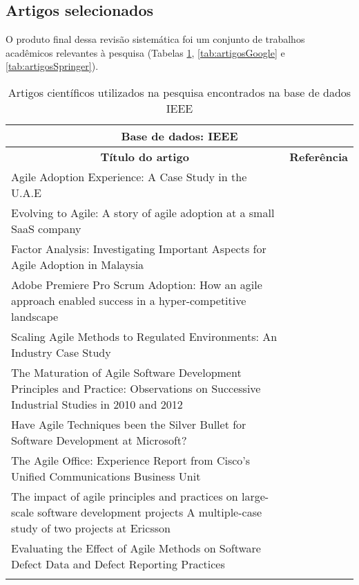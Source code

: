 \subsection{Artigos selecionados}

O produto final dessa revisão sistemática foi um conjunto de trabalhos acadêmicos relevantes à pesquisa (Tabelas \ref{tab:artigosIEEE}, \ref{tab:artigosGoogle} e \ref{tab:artigosSpringer}).

\begin{table}
	\centering
	\captionsetup{justification=centering,margin=1cm}
	\begin{tabularx}{\linewidth}{ | X | p{3cm} | } \hline \multicolumn{2}{|c|}{\textbf{Base de dados: IEEE}} \\ \hline
	\multicolumn{1}{|c|}{\textbf{Título do artigo}} & \multicolumn{1}{|c|}{\textbf{Referência}} \\ \hline
		Agile Adoption Experience: A Case Study in the U.A.E & \cite{Hajjdiab2011} \\ \hline
		Evolving to Agile: A story of agile adoption at a small SaaS company & \cite{Block2011} \\ \hline
		Factor Analysis: Investigating Important Aspects for Agile Adoption in Malaysia & \cite{Asnawi2012} \\ \hline
		Adobe Premiere Pro Scrum Adoption: How an agile approach enabled success in a hyper-competitive landscape & \cite{Adobe2012} \\ \hline
		Scaling Agile Methods to Regulated Environments: An Industry Case Study & \cite{Fitzgerald2013} \\ \hline
		The Maturation of Agile Software Development Principles and Practice: Observations on Successive Industrial Studies in 2010 and 2012 & \cite{Bustard2013} \\ \hline
		Have Agile Techniques been the Silver Bullet for Software Development at Microsoft? & \cite{Microsoft2013} \\ \hline
		The Agile Office: Experience Report from Cisco’s Unified Communications Business Unit & \cite{Cisco2011} \\ \hline
		The impact of agile principles and practices on large-scale software development projects A multiple-case study of two projects at Ericsson & \cite{Ericsson2013} \\ \hline
		Evaluating the Effect of Agile Methods on Software Defect Data and Defect Reporting Practices & \cite{Korhonen2010} \\ \hline
	\caption{Artigos científicos utilizados na pesquisa encontrados na base de dados IEEE}
	\label{tab:artigosIEEE}
	\end{tabularx}
\end{table}

